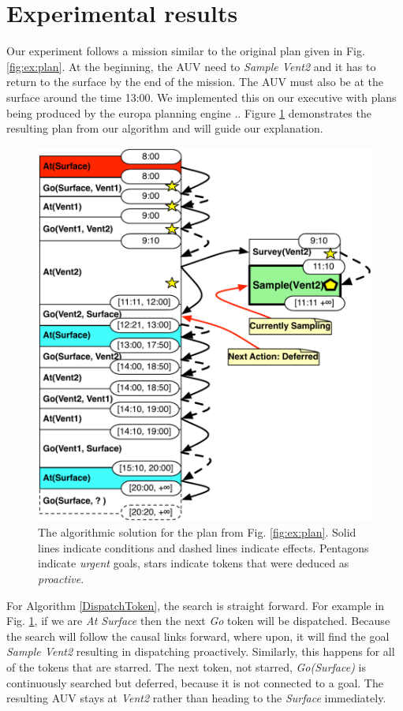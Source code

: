 \section{Experimental results}
\label{sec:exp}

Our experiment follows a mission similar to the original plan given in
Fig. \ref{fig:ex:plan}. At the beginning, the AUV need to {\em Sample
  Vent2} and it has to return to the surface by the end of the
mission. The AUV must also be at the surface around the time 13:00. We
implemented this on our executive with plans being produced by the
europa planning engine \cite{frank2003}.. Figure \ref{fig:ex:mixed1} demonstrates the resulting
plan from our algorithm and will guide our explanation.

\begin{figure}[!htbp]
  \centering
  \includegraphics[width=0.8\columnwidth]{figs/example_MixedInitial}
  \caption{\small The algorithmic solution for the plan from
    Fig. \ref{fig:ex:plan}. Solid lines indicate conditions and
    dashed lines indicate effects. Pentagons indicate {\em urgent}
    goals, stars indicate tokens that were deduced as {\em proactive}.}
  \label{fig:ex:mixed1}
\end{figure}

For Algorithm \ref{DispatchToken}, the search is straight forward. For
example in Fig. \ref{fig:ex:mixed1}, if we are {\em At Surface} then
the next {\em Go} token will be dispatched. Because the search will
follow the causal links forward, where upon, it will find the goal
{\em Sample Vent2} resulting in dispatching proactively.  Similarly,
this happens for all of the tokens that are starred. The next token,
not starred, {\em Go(Surface)} is continuously searched but deferred,
because it is not connected to a goal. The resulting AUV stays at {\em
  Vent2} rather than heading to the {\em Surface} immediately.

